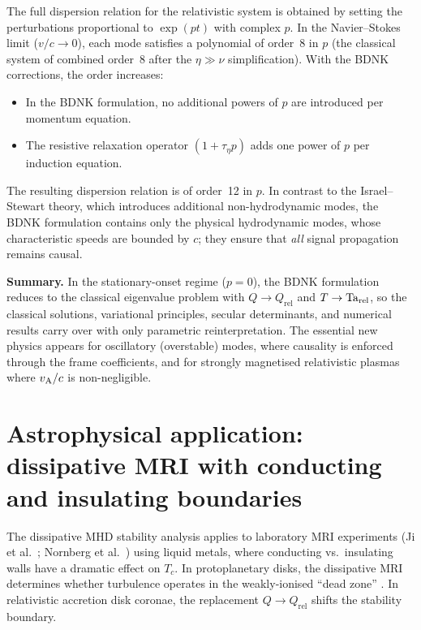 The full dispersion relation for the relativistic system is obtained by
setting the perturbations proportional to $\exp(pt)$ with complex $p$.
In the Navier--Stokes limit ($v/c \to 0$), each mode satisfies
a polynomial of order~8 in $p$ (the classical system of combined
order~8 after the $\eta\gg\nu$ simplification).  With the BDNK
corrections, the order increases:
\begin{itemize}
\item In the BDNK formulation, no additional powers of
  $p$ are introduced per momentum equation.
\item The resistive relaxation operator $(1+\tau_\eta p)$ adds one power
  of $p$ per induction equation.
\end{itemize}
The resulting dispersion relation is of order~12 in $p$.  In contrast to the Israel--Stewart theory, which introduces additional non-hydrodynamic modes, the BDNK
formulation contains only the physical hydrodynamic modes,
whose characteristic speeds are bounded by $c$; they ensure that \emph{all} signal propagation
remains causal.

\medskip
\noindent\textbf{Summary.}
In the stationary-onset regime ($p=0$), the BDNK formulation
reduces to the classical eigenvalue problem with $Q\to Q_{\mathrm{rel}}$
and $T\to\mathrm{Ta}_{\mathrm{rel}}$, so the classical solutions, variational
principles, secular determinants, and numerical results carry over with
only parametric reinterpretation.  The essential new physics appears for
oscillatory (overstable) modes, where causality is enforced through the
frame coefficients, and for strongly magnetised relativistic plasmas where
$v_{\mathrm{A}}/c$ is non-negligible.

\section{Astrophysical application: dissipative MRI with conducting and
  insulating boundaries}
\label{sec:rel-87-89-astro}

The dissipative MHD stability analysis applies to laboratory MRI
experiments (Ji et al.~\cite{Ji2001}; Nornberg et al.~\cite{Nornberg2010})
using liquid metals, where conducting vs.\ insulating walls have a
dramatic effect on $T_c$.  In protoplanetary disks, the dissipative MRI
determines whether turbulence operates in the weakly-ionised ``dead
zone'' \cite{BalbusHawley1998,Lesur2021}.  In relativistic accretion
disk coronae, the replacement $Q \to Q_{\mathrm{rel}}$ shifts the
stability boundary.

